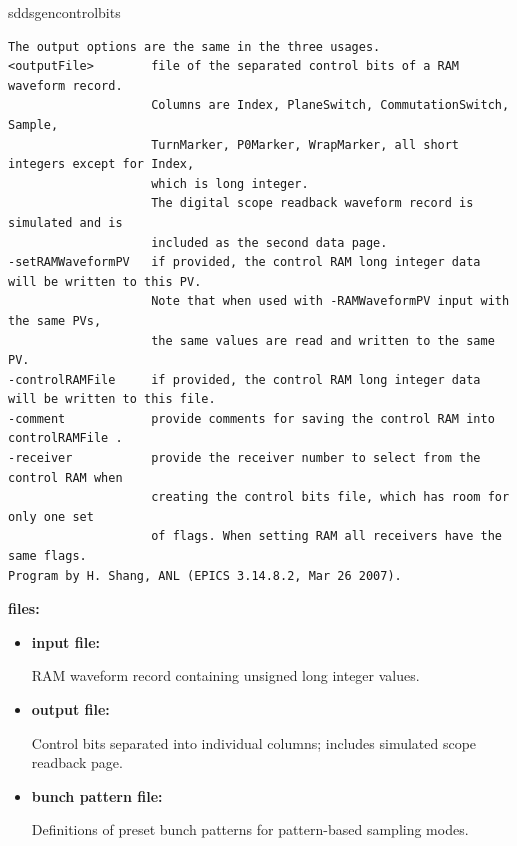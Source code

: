 \begin{sddsprog}{sddsgencontrolbits}
\begin{verbatim}
The output options are the same in the three usages.
<outputFile>        file of the separated control bits of a RAM waveform record. 
                    Columns are Index, PlaneSwitch, CommutationSwitch, Sample, 
                    TurnMarker, P0Marker, WrapMarker, all short integers except for Index, 
                    which is long integer.
                    The digital scope readback waveform record is simulated and is 
                    included as the second data page. 
-setRAMWaveformPV   if provided, the control RAM long integer data will be written to this PV. 
                    Note that when used with -RAMWaveformPV input with the same PVs, 
                    the same values are read and written to the same PV. 
-controlRAMFile     if provided, the control RAM long integer data will be written to this file. 
-comment            provide comments for saving the control RAM into controlRAMFile .
-receiver           provide the receiver number to select from the control RAM when
                    creating the control bits file, which has room for only one set
                    of flags. When setting RAM all receivers have the same flags.
Program by H. Shang, ANL (EPICS 3.14.8.2, Mar 26 2007).

\end{verbatim}
\normalsize

\item {\bf files:}
\begin{itemize}
\item {\bf input file:} \par
  RAM waveform record containing unsigned long integer values.
\item {\bf output file:} \par
  Control bits separated into individual columns; includes simulated scope readback page.
\item {\bf bunch pattern file:} \par
  Definitions of preset bunch patterns for pattern-based sampling modes.


\end{itemize}
\end{sddsprog}
